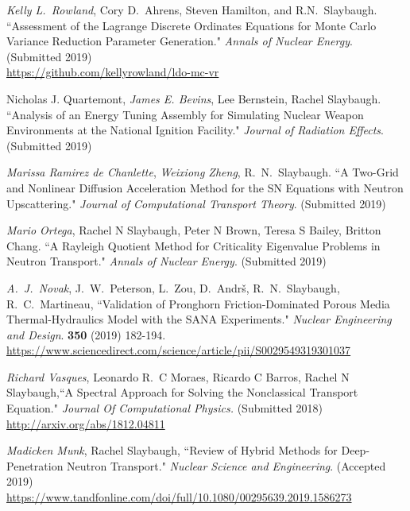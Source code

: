 \begin{bibsection}
\item \textit{Kelly L.\ Rowland}, Cory D.\ Ahrens, Steven Hamilton, and R.N.\ Slaybaugh. ``Assessment of the Lagrange Discrete Ordinates Equations for Monte Carlo Variance Reduction Parameter Generation." \textit{Annals of Nuclear Energy}. (Submitted 2019)\\
\url{https://github.com/kellyrowland/ldo-mc-vr}

\item Nicholas J. Quartemont, \textit{James E. Bevins}, Lee Bernstein, Rachel Slaybaugh. ``Analysis of an Energy Tuning Assembly for Simulating Nuclear Weapon Environments at the National Ignition Facility." \textit{Journal of Radiation Effects}. (Submitted 2019)

\item \textit{Marissa Ramirez de Chanlette}, \textit{Weixiong Zheng}, R.\ N.\ Slaybaugh. ``A Two-Grid and Nonlinear Diffusion Acceleration Method for the SN Equations with Neutron Upscattering." \textit{Journal of Computational Transport Theory}. (Submitted 2019)

\item \textit{Mario Ortega}, Rachel N Slaybaugh, Peter N Brown, Teresa S Bailey, Britton Chang. ``A Rayleigh Quotient Method for Criticality Eigenvalue Problems in Neutron Transport." \textit{Annals of Nuclear Energy}. (Submitted 2019)

\item \textit{A.\ J.\ Novak}, J.\ W.\ Peterson, L.\ Zou, D.\ Andr\v{s}, R.\ N.\ Slaybaugh, R.\ C.\ Martineau, ``Validation of Pronghorn Friction-Dominated Porous Media Thermal-Hydraulics Model with the SANA Experiments." \textit{Nuclear Engineering and Design}. \textbf{350} (2019) 182-194.\\
\url{https://www.sciencedirect.com/science/article/pii/S0029549319301037}

\item \textit{Richard Vasques},  Leonardo R.\ C Moraes, Ricardo C Barros, Rachel N Slaybaugh,``A Spectral Approach for Solving the Nonclassical Transport Equation." \textit{Journal Of Computational Physics.} (Submitted 2018)\\
\url{http://arxiv.org/abs/1812.04811}

\item \textit{Madicken Munk}, Rachel Slaybaugh, ``Review of Hybrid Methods for Deep-Penetration Neutron Transport."  \textit{Nuclear Science and Engineering}. (Accepted 2019)\\
\url{https://www.tandfonline.com/doi/full/10.1080/00295639.2019.1586273}


\end{bibsection}

